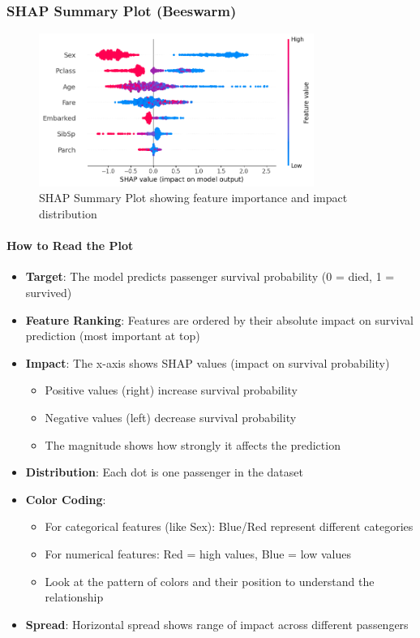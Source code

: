 \documentclass{article}
\begin{document}
\subsubsection{SHAP Summary Plot (Beeswarm)}
\begin{figure}[h]
    \centering
    \includegraphics[width=0.8\textwidth]{images/bee_swarm.png}
    \caption{SHAP Summary Plot showing feature importance and impact distribution}
    \label{fig:shap_summary}
\end{figure}

\paragraph{How to Read the Plot}
\begin{itemize}
    \item \textbf{Target}: The model predicts passenger survival probability (0 = died, 1 = survived)
    \item \textbf{Feature Ranking}: Features are ordered by their absolute impact on survival prediction (most important at top)
    \item \textbf{Impact}: The x-axis shows SHAP values (impact on survival probability)
        \begin{itemize}
            \item Positive values (right) increase survival probability
            \item Negative values (left) decrease survival probability
            \item The magnitude shows how strongly it affects the prediction
        \end{itemize}
    \item \textbf{Distribution}: Each dot is one passenger in the dataset
    \item \textbf{Color Coding}:
        \begin{itemize}
            \item For categorical features (like Sex): Blue/Red represent different categories
            \item For numerical features: Red = high values, Blue = low values
            \item Look at the pattern of colors and their position to understand the relationship
        \end{itemize}
    \item \textbf{Spread}: Horizontal spread shows range of impact across different passengers
\end{itemize}
\end{document}

